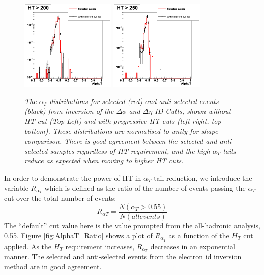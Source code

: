 \documentclass[12pt]{article}
\begin{document}
\begin{figure}[h!]
\includegraphics[width=45mm]{leptonicalphaT/alphat_5}
\hspace*{6mm}
\includegraphics[width=45mm]{leptonicalphaT/alphat_6}
\caption{\textit{The $\alpha_{T}$ distributions for selected (red) and anti-selected events (black) from inversion of the $\Delta \phi$ and $\Delta \eta$ ID Cutts, shown without HT cut (Top Left) and with progressive HT cuts (left-right, top-bottom). These distributions are normalised to unity for shape comparison. There is good agreement between the selected and anti-selected samples regardless of HT requirement, and the high $\alpha_{T}$ tails reduce as expected when moving to higher HT cuts.}}
\label{fig:AlphaTbyHT}
\end{figure}

In order to demonstrate the power of HT in $\alpha_{T}$ tail-reduction, we introduce the variable $R_{\alpha_T}$ which is defined as the ratio of the number of events passing the $\alpha_T$ cut over the total number of events:
\begin{equation}
R_{\alpha T} = \frac{N(\alpha_{T}>0.55)}{N(all events)}
\end{equation}
The ``default'' cut value here is the value prompted from the all-hadronic analysis, 0.55. Figure \ref{fig:AlphaT_Ratio} shows a plot of $R_{\alpha_T}$ as a function of the $H_{T}$ cut applied. As the $H_{T}$ requirement increases, $R_{\alpha_T}$ decreases in an exponential manner. The selected and anti-selected events from the electron id inversion method are in good agreement.
\end{document}
